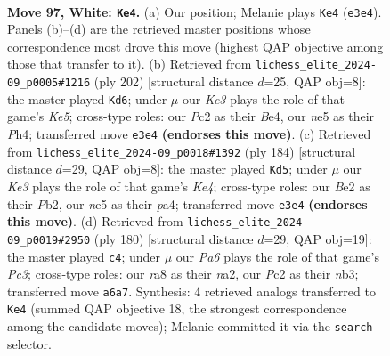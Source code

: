 \documentclass[11pt]{article}
\begin{document}
\clearpage

\begin{figure}[p]\centering
\begin{subfigure}{0.46\textwidth}\centering
\resizebox{\linewidth}{!}{%
\newchessgame
\chessboard[
  setfen={r7/3k4/PR6/4n1P1/8/4K2P/2P1B3/8 w - - 1 97},
  showmover=false,
  pgfstyle=straightmove, color=movearrow, markmove={e3-e4}
]}
\caption{}
\end{subfigure}\hfill
\begin{subfigure}{0.46\textwidth}\centering
\resizebox{\linewidth}{!}{%
\newchessgame
\chessboard[
  setfen={3k4/1R4P1/8/4K2p/4B2P/8/8/6r1 w - - 1 102},
  showmover=false,
  pgfstyle=straightmove, color=movearrow, markmove={e5-d6}
]}
\caption{}
\end{subfigure}
\\[4pt]
\begin{subfigure}{0.46\textwidth}\centering
\resizebox{\linewidth}{!}{%
\newchessgame
\chessboard[
  setfen={5k2/p7/2P2P2/8/p3K3/8/1P4R1/2r5 w - - 1 93},
  showmover=false,
  pgfstyle=straightmove, color=movearrow, markmove={e4-d5}
]}
\caption{}
\end{subfigure}\hfill
\begin{subfigure}{0.46\textwidth}\centering
\resizebox{\linewidth}{!}{%
\newchessgame
\chessboard[
  setfen={8/4k1p1/8/5p1P/5P2/1nP1BK2/n7/8 w - - 0 91},
  showmover=false,
  pgfstyle=straightmove, color=movearrow, markmove={c3-c4}
]}
\caption{}
\end{subfigure}
\caption{\textbf{Move 97, White: \texttt{Ke4}.} (a) Our position; Melanie plays \texttt{Ke4} (\texttt{e3e4}). Panels (b)--(d) are the retrieved master positions whose correspondence most drove this move (highest QAP objective among those that transfer to it). (b) Retrieved from \texttt{lichess\_elite\_2024-09\_p0005\#1216} (ply 202) [structural distance $d$=25, QAP obj=8]: the master played \texttt{Kd6}; under $\mu$ our \emph{Ke3} plays the role of that game's \emph{Ke5}; cross-type roles: our \emph{P}c2 as their \emph{B}e4, our \emph{n}e5 as their \emph{P}h4; transferred move \texttt{e3e4} \textbf{(endorses this move)}. (c) Retrieved from \texttt{lichess\_elite\_2024-09\_p0018\#1392} (ply 184) [structural distance $d$=29, QAP obj=8]: the master played \texttt{Kd5}; under $\mu$ our \emph{Ke3} plays the role of that game's \emph{Ke4}; cross-type roles: our \emph{B}e2 as their \emph{P}b2, our \emph{n}e5 as their \emph{p}a4; transferred move \texttt{e3e4} \textbf{(endorses this move)}. (d) Retrieved from \texttt{lichess\_elite\_2024-09\_p0019\#2950} (ply 180) [structural distance $d$=29, QAP obj=19]: the master played \texttt{c4}; under $\mu$ our \emph{Pa6} plays the role of that game's \emph{Pc3}; cross-type roles: our \emph{r}a8 as their \emph{n}a2, our \emph{P}c2 as their \emph{n}b3; transferred move \texttt{a6a7}. Synthesis: 4 retrieved analogs transferred to \texttt{Ke4} (summed QAP objective 18, the strongest correspondence among the candidate moves); Melanie committed it via the \texttt{search} selector.}
\label{fig:thought-m192}
\end{figure}
\end{document}
